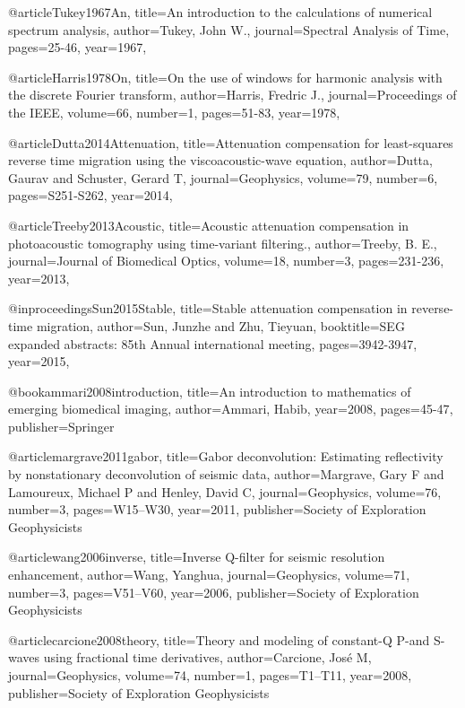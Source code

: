 {@article{Tukey1967An,
  title={An introduction to the calculations of numerical spectrum analysis},
  author={Tukey, John W.},
  journal={Spectral Analysis of Time},
  pages={25-46},
  year={1967},
}

@article{Harris1978On,
  title={On the use of windows for harmonic analysis with the discrete {F}ourier transform},
  author={Harris, Fredric J.},
  journal={Proceedings of the IEEE},
  volume={66},
  number={1},
  pages={51-83},
  year={1978},
}

@article{Dutta2014Attenuation,
  title={Attenuation compensation for least-squares reverse time migration using the viscoacoustic-wave equation},
  author={Dutta, Gaurav and Schuster, Gerard T},
  journal={Geophysics},
  volume={79},
  number={6},
  pages={S251-S262},
  year={2014},
}

@article{Treeby2013Acoustic,
  title={Acoustic attenuation compensation in photoacoustic tomography using time-variant filtering.},
  author={Treeby, B. E.},
  journal={Journal of Biomedical Optics},
  volume={18},
  number={3},
  pages={231-236},
  year={2013},
}

@inproceedings{Sun2015Stable,
  title={Stable attenuation compensation in reverse-time migration},
  author={Sun, Junzhe and Zhu, Tieyuan},
  booktitle={SEG expanded abstracts: 85th Annual international meeting},
  pages={3942-3947},
  year={2015},
}

@book{ammari2008introduction,
  title={An introduction to mathematics of emerging biomedical imaging},
  author={Ammari, Habib},
  year={2008},
  pages={45-47},
  publisher={Springer}
}


@article{margrave2011gabor,
  title={Gabor deconvolution: Estimating reflectivity by nonstationary deconvolution of seismic data},
  author={Margrave, Gary F and Lamoureux, Michael P and Henley, David C},
  journal={Geophysics},
  volume={76},
  number={3},
  pages={W15--W30},
  year={2011},
  publisher={Society of Exploration Geophysicists}
}

@article{wang2006inverse,
  title={Inverse {Q}-filter for seismic resolution enhancement},
  author={Wang, Yanghua},
  journal={Geophysics},
  volume={71},
  number={3},
  pages={V51--V60},
  year={2006},
  publisher={Society of Exploration Geophysicists}
}

@article{carcione2008theory,
  title={Theory and modeling of constant-{Q} {P}-and {S}-waves using fractional time derivatives},
  author={Carcione, Jos{\'e} M},
  journal={Geophysics},
  volume={74},
  number={1},
  pages={T1--T11},
  year={2008},
  publisher={Society of Exploration Geophysicists}
}


}
